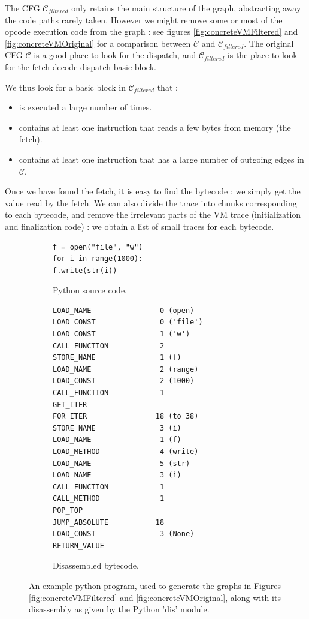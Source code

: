 \documentclass[english]{article}
\begin{document}
The CFG $\mathcal{C}_{filtered}$ only retains the main structure of the graph, abstracting away the code paths rarely taken. However we might remove some or most of the opcode execution code from the graph : see figures \ref{fig:concreteVMFiltered} and \ref{fig:concreteVMOriginal} for a comparison between $\mathcal{C}$ and $\mathcal{C}_{filtered}$. The original CFG $\mathcal{C}$ is a good place to look for the dispatch, and $\mathcal{C}_{filtered}$ is the place to look for the fetch-decode-dispatch basic block. 

We thus look for a basic block in $\mathcal{C}_{filtered}$ that :
\begin{itemize}
	\item is executed a large number of times.
	\item contains at least one instruction that reads a few bytes from memory (the fetch).
	\item contains at least one instruction that has a large number of outgoing edges in $\mathcal{C}$.
\end{itemize}

Once we have found the fetch, it is easy to find the bytecode : we simply get the value read by the fetch. We can also divide the trace into chunks corresponding to each bytecode, and remove the irrelevant parts of the VM trace (initialization and finalization code) : we obtain a list of small traces for each bytecode.

\begin{figure}[htp]
	\centering 
	\begin{subfigure}{.5\textwidth}
		\centering 	
		\begin{BVerbatim}
f = open("file", "w")
for i in range(1000):
f.write(str(i))
		\end{BVerbatim}
		\caption{Python source code.}
		\label{fig:examplePythonProg:source}
	\end{subfigure}%
	\begin{subfigure}{.5\textwidth}
		\centering 	
		\begin{BVerbatim}
LOAD_NAME                0 (open)
LOAD_CONST               0 ('file')
LOAD_CONST               1 ('w')
CALL_FUNCTION            2
STORE_NAME               1 (f)
LOAD_NAME                2 (range)
LOAD_CONST               2 (1000)
CALL_FUNCTION            1
GET_ITER
FOR_ITER                18 (to 38)
STORE_NAME               3 (i)
LOAD_NAME                1 (f)
LOAD_METHOD              4 (write)
LOAD_NAME                5 (str)
LOAD_NAME                3 (i)
CALL_FUNCTION            1
CALL_METHOD              1
POP_TOP
JUMP_ABSOLUTE           18
LOAD_CONST               3 (None)
RETURN_VALUE
		\end{BVerbatim}
		\caption{Disassembled bytecode.}
		\label{fig:examplePythonProg:bytecode}
	\end{subfigure}
	\caption{An example python program, used to generate the graphs in Figures 	\ref{fig:concreteVMFiltered} and \ref{fig:concreteVMOriginal}, along with its disassembly as given by the Python 'dis' module.}
	\label{fig:examplePythonProg}
\end{figure}
\end{document}
